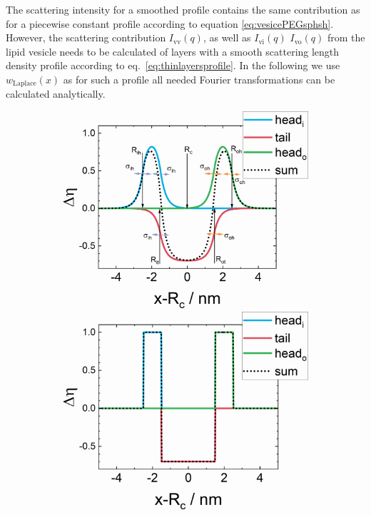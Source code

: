 The scattering intensity for a smoothed profile contains the same contribution as for a piecewise constant profile according to equation \ref{eq:vesicePEGsphsh}. However, the scattering contribution $I_\mathrm{vv}(q)$, as well as $I_\mathrm{vi}(q)$ $I_\mathrm{vo}(q)$ from the lipid vesicle needs to be calculated of layers with a smooth scattering length density profile according to eq.\ \ref{eq:thinlayersprofile}. In the following we use $w_\mathrm{Laplace}(x)$ as for such a profile all needed Fourier transformations can be calculated analytically.
\begin{figure}[htb]
\begin{subfigure}[b]{.48\textwidth}
   \centering
    \includegraphics[width=\textwidth]{../images/form_factor/vesicles/vesicle_profile1.png}
    \includegraphics[width=\textwidth]{../images/form_factor/vesicles/vesicle_profile2.png}

\end{subfigure}
\end{figure}
